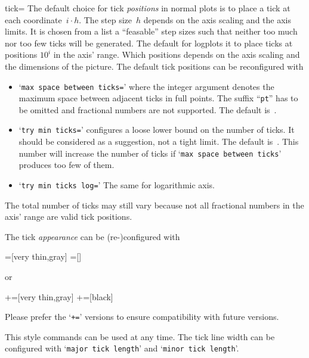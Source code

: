 \begin{pgfplotsxykey}{\x tick=}
\noindent
The default choice for tick \emph{positions} in normal plots is to place a tick at each coordinate~$i\cdot h$. The step size~$h$ depends on the axis scaling and the axis limits. It is chosen from a list a ``feasable'' step sizes such that neither too much nor too few ticks will be generated. The default for logplots it to place ticks at positions $10^i$ in the axis' range. Which positions depends on the axis scaling and the dimensions of the picture. The default tick positions can be reconfigured with
\begin{itemize}
	\item `\lstinline!max space between ticks=!' where the integer argument denotes the maximum space between adjacent ticks in full points. The suffix ``\texttt{pt}'' has to be omitted and fractional numbers are not supported. The default is~\axisdefaulttickwidth.
	\item `\lstinline!try min ticks=!' configures a loose lower bound on the number of ticks. It should be considered as a suggestion, not a tight limit. The default is~\axisdefaulttryminticks. This number will increase the number of ticks if `\texttt{max space between ticks}' produces too few of them.
	\item `\lstinline!try min ticks log=!' The same for logarithmic axis.
\end{itemize}
The total number of ticks may still vary because not all fractional numbers in the axis' range are valid tick positions.


\noindent
The tick \emph{appearance} can be (re-)configured with
\begin{codeexample}
=[very thin,gray]
=[]
\end{codeexample}
or
\begin{codeexample}
+=[very thin,gray]
+=[black]
\end{codeexample}
Please prefer the `\texttt{+=}' versions to ensure compatibility with future versions.

This style commands can be used at any time. The tick line width can be configured with `\texttt{major tick length}' and `\texttt{minor tick length}'.
\end{pgfplotsxykey}

